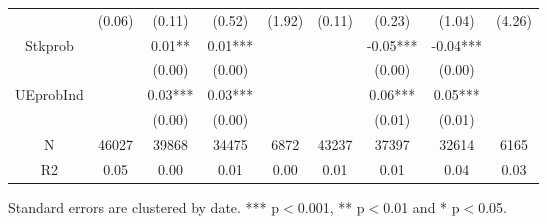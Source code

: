 \documentclass[12pt,notitlepage,onecolumn,aps,pra]{article}
\begin{document}
\begin{table}[ht]
\begin{adjustbox}{width={0.9\textwidth},totalheight={\textheight}}
\begin{threeparttable}
\begin{tabular}{ccccccccc}
             &   (0.06) &    (0.11) &     (0.52) &      (1.92) &    (0.11) &     (0.23) &      (1.04) &       (4.26) \\
Stkprob      &          &    0.01** &    0.01*** &             &           &   -0.05*** &    -0.04*** &              \\
             &          &    (0.00) &     (0.00) &             &           &     (0.00) &      (0.00) &              \\
UEprobInd    &          &   0.03*** &    0.03*** &             &           &    0.06*** &     0.05*** &              \\
             &          &    (0.00) &     (0.00) &             &           &     (0.01) &      (0.01) &              \\
N            &    46027 &     39868 &      34475 &        6872 &     43237 &      37397 &       32614 &         6165 \\
R2           &     0.05 &      0.00 &       0.01 &        0.00 &      0.01 &       0.01 &        0.04 &         0.03 \\
\bottomrule
\end{tabular}
\begin{tablenotes}\item Standard errors are clustered by date. *** p$<$0.001, ** p$<$0.01 and * p$<$0.05. 
\end{tablenotes}
\end{threeparttable}
\end{adjustbox}
\end{table}
\end{document}
